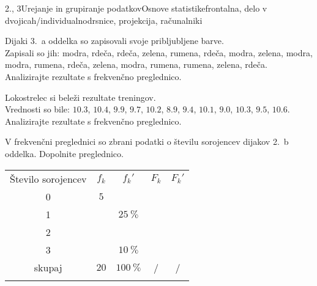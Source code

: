 \begin{priprava}{2., 3}{}{Urejanje in grupiranje podatkov}{Osnove statistike}{frontalna, delo v dvojicah/individualno}{drsnice, projekcija, računalniki}
                
                
                    \begin{naloga}
                        Dijaki 3.~a oddelka so zapisovali svoje pribljubljene barve. \\
                        Zapisali so jih: modra, rdeča, rdeča, zelena, rumena, rdeča, modra, zelena, modra, modra, rumena, rdeča, zelena, modra, rumena, rumena, zelena, rdeča. \\
                        Analizirajte rezultate s frekvenčno preglednico. 
                    \end{naloga}

                    \begin{naloga}
                        Lokostrelec si beleži rezultate treningov. \\
                        Vrednosti so bile: $10.3$, $10.4$, $9.9$, $9.7$, $10.2$, $8.9$, $9.4$, $10.1$, $9.0$, $10.3$, $9.5$, $10.6$. \\
                        Analizirajte rezultate s frekvenčno preglednico. 
                    \end{naloga}
                

                
        
                   \begin{naloga}
                    
                    V frekvenčni preglednici so zbrani podatki o številu sorojencev dijakov 2.~b oddelka.
                    Dopolnite preglednico.
    
                        \begin{table}[H]
                            \centering
                            \begin{tabular}{||c|c|c|c|c||} 
                            \hhline{|t:=====:t|}
                            \rowcolor[rgb]{0.843,0.718,0.718} 
                            Število sorojencev  & $f_k$ & $f_k'$ & $F_k$ & $F_k'$   \\ 
                            \hhline{|:=====:|}
                            0 & $5$  & & &  \\ 
                            \hline
                            1 & & $25~\%$ & &    \\ 
                            \hline
                            2 & & & &    \\ 
                            \hline
                            3 & & $10~\%$ & &   \\
                            \hline
                            skupaj & $20$ & $100~\%$ & / & /    \\
                            \hhline{|b:=====:b|}
                            \end{tabular}
                        \end{table}
                    \end{naloga}
    
            



\end{priprava}